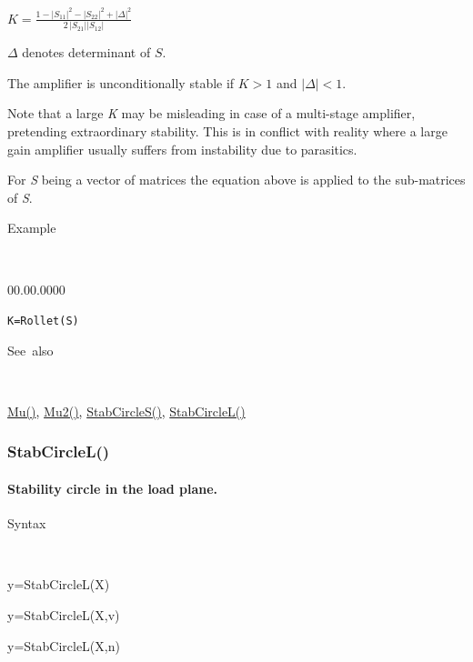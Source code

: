 \medskip{}
\noindent $K={\displaystyle \frac{1-\left|S_{11}\right|^{2}-\left|S_{22}\right|^{2}+\left|\Delta\right|^{2}}{2\,\left|S_{21}\right|\left|S_{12}\right|}}$
\medskip{}

$\Delta$ denotes determinant of $S$.

\noindent The amplifier is unconditionally stable if $K>1$ and $\left|\Delta\right|<1$.

\noindent Note that a large \textit{K} may be misleading in case of
a multi-stage amplifier, pretending extraordinary stability. This
is in conflict with reality where a large gain amplifier usually suffers
from instability due to parasitics.

\noindent For \textit{S} being a vector of matrices the equation above
is applied to the sub-matrices of \textit{S}.

\begin{description}
\item [Example]~
\end{description}
\begin{lyxlist}{00.00.0000}
\item [\texttt{K=Rollet(S)}]~
\end{lyxlist}
\begin{description}
\item [See~also]~
\end{description}
\textcolor{blue}{\hyperlink{Mu}{Mu()}}\textcolor{black}{,} \textcolor{blue}{\hyperlink{Mu2}{Mu2()}}\textcolor{black}{,}
\textcolor{blue}{\hyperlink{StabCircleS}{StabCircleS()}}\textcolor{black}{,}
\textcolor{blue}{\hyperlink{StabCircleL}{StabCircleL()}}


\newpage
\subsubsection*{\hypertarget{StabCircleL}{}{\Large StabCircleL()}}


\paragraph{\label{par:StabCircleL}Stability circle in the load plane.}

\begin{description}
\item [Syntax]~
\end{description}
y=StabCircleL(X)

\noindent y=StabCircleL(X,v)

\noindent y=StabCircleL(X,n)

